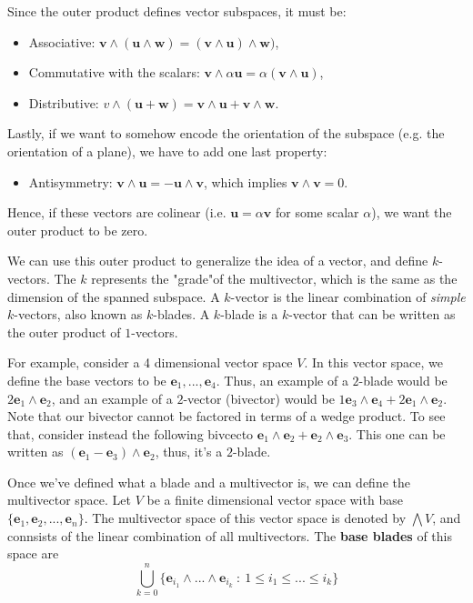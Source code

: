 Since the outer product defines vector subspaces, it must be:

\begin{itemize}
    \item Associative: $\mathbf v \wedge (\mathbf u \wedge \mathbf w) = (\mathbf v \wedge \mathbf u) \wedge \mathbf w)$,
    \item Commutative with the scalars: $\mathbf v \wedge \alpha \mathbf u = \alpha (\mathbf v \wedge \mathbf u)$,
    \item Distributive: $v \wedge (\mathbf u + \mathbf w) = \mathbf v \wedge \mathbf u  + \mathbf v \wedge \mathbf w$.
\end{itemize}

Lastly, if we want to somehow encode the orientation of the subspace (e.g. the orientation of a plane),
we have to add one last property:
\begin{itemize}
    \item Antisymmetry: $\mathbf v \wedge \mathbf u = - \mathbf u \wedge \mathbf v$, which implies $\mathbf v \wedge \mathbf v = 0$.
\end{itemize}


Hence, if these vectors are colinear (i.e. $\mathbf u = \alpha \mathbf v$ for some scalar $\alpha$), we want
the outer product to be zero.

We can use this outer product to generalize the idea of a vector, and define $k$-vectors.
The $k$ represents the "grade"of the multivector, which is the same as the dimension of the spanned subspace.
A $k$-vector is the linear combination of \textit{simple} $k$-vectors, also known as $k$-blades.
A $k$-blade is a $k$-vector that can be written as the outer product of $1$-vectors.

For example, consider a 4 dimensional vector space $V$. In this vector space, we define the base vectors
to be $\mathbf e_1,...,\mathbf e_4$. Thus, an example of a $2$-blade would be $2 \mathbf e_1 \wedge \mathbf e_2$, and an example
of a $2$-vector (bivector) would be $1 \mathbf e_3 \wedge \mathbf e_4 + 2 \mathbf e_1 \wedge \mathbf e_2$.
Note that our bivector cannot be factored in terms of a wedge product. To see that,
consider instead the following bivcecto $\mathbf e_1 \wedge \mathbf e_2 + \mathbf e_2 \wedge \mathbf e_3$. This one
can be written as $(\mathbf e_1 - \mathbf e_3) \wedge \mathbf e_2$, thus, it's a $2$-blade.

Once we've defined what a blade and a multivector is, we can define the multivector space.
Let $V$ be a finite dimensional vector space with base $\{\mathbf e_1,\mathbf e_2,...,\mathbf e_n\}$. The multivector space
of this vector space is denoted by $\bigwedge V$, and connsists of the linear combination
of all multivectors. The \textbf{base blades} of this space are
$$
\bigcup_{k=0}^n \{\mathbf e_{i_1}\wedge ...\wedge \mathbf e_{i_k} \ : \ 1 \leq i_1 \leq... \leq i_k\}
$$

